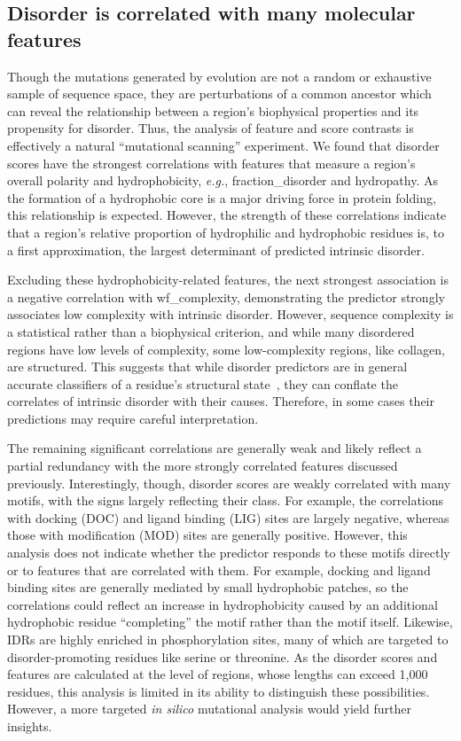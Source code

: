 \subsection{Disorder is correlated with many molecular features}
Though the mutations generated by evolution are not a random or exhaustive sample of sequence space, they are perturbations of a common ancestor which can reveal the relationship between a region's biophysical properties and its propensity for disorder. Thus, the analysis of feature and score contrasts is effectively a natural ``mutational scanning'' experiment. We found that disorder scores have the strongest correlations with features that measure a region's overall polarity and hydrophobicity, \textit{e.g.}, fraction\_disorder and hydropathy. As the formation of a hydrophobic core is a major driving force in protein folding, this relationship is expected. However, the strength of these correlations indicate that a region's relative proportion of hydrophilic and hydrophobic residues is, to a first approximation, the largest determinant of predicted intrinsic disorder.

Excluding these hydrophobicity-related features, the next strongest association is a negative correlation with wf\_complexity, demonstrating the predictor strongly associates low complexity with intrinsic disorder. However, sequence complexity is a statistical rather than a biophysical criterion, and while many disordered regions have low levels of complexity, some low-complexity regions, like collagen, are structured. This suggests that while disorder predictors are in general accurate classifiers of a residue's structural state~\cite{Necci2021}, they can conflate the correlates of intrinsic disorder with their causes. Therefore, in some cases their predictions may require careful interpretation.

The remaining significant correlations are generally weak and likely reflect a partial redundancy with the more strongly correlated features discussed previously. Interestingly, though, disorder scores are weakly correlated with many motifs, with the signs largely reflecting their class. For example, the correlations with docking (DOC) and ligand binding (LIG) sites are largely negative, whereas those with modification (MOD) sites are generally positive. However, this analysis does not indicate whether the predictor responds to these motifs directly or to features that are correlated with them. For example, docking and ligand binding sites are generally mediated by small hydrophobic patches, so the correlations could reflect an increase in hydrophobicity caused by an additional hydrophobic residue ``completing'' the motif rather than the motif itself. Likewise, IDRs are highly enriched in phosphorylation sites, many of which are targeted to disorder-promoting residues like serine or threonine. As the disorder scores and features are calculated at the level of regions, whose lengths can exceed 1,000 residues, this analysis is limited in its ability to distinguish these possibilities. However, a more targeted \textit{in silico} mutational analysis would yield further insights.

